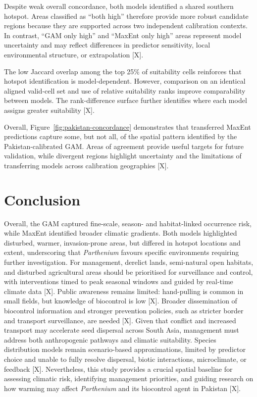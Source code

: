 Despite weak overall concordance, both models identified a shared southern hotspot. Areas classified as ``both high'' therefore provide more robust candidate regions because they are supported across two independent calibration contexts. In contrast, ``GAM only high'' and ``MaxEnt only high'' areas represent model uncertainty and may reflect differences in predictor sensitivity, local environmental structure, or extrapolation [X].

The low Jaccard overlap among the top 25\% of suitability cells reinforces that hotspot identification is model-dependent. However, comparison on an identical aligned valid-cell set and use of relative suitability ranks improve comparability between models. The rank-difference surface further identifies where each model assigns greater suitability [X].

Overall, Figure~\ref{fig:pakistan-concordance} demonstrates that transferred MaxEnt predictions capture some, but not all, of the spatial pattern identified by the Pakistan-calibrated GAM. Areas of agreement provide useful targets for future validation, while divergent regions highlight uncertainty and the limitations of transferring models across calibration geographies [X].

\section{Conclusion}

Overall, the GAM captured fine-scale, season- and habitat-linked occurrence risk, while MaxEnt identified broader climatic gradients. Both models highlighted disturbed, warmer, invasion-prone areas, but differed in hotspot locations and extent, underscoring that \textit{Parthenium} favours specific environments requiring further investigation. For management, derelict lands, semi-natural open habitats, and disturbed agricultural areas should be prioritised for surveillance and control, with interventions timed to peak seasonal windows and guided by real-time climate data [X]. Public awareness remains limited: hand-pulling is common in small fields, but knowledge of biocontrol is low [X]. Broader dissemination of biocontrol information and stronger prevention policies, such as stricter border and transport surveillance, are needed [X]. Given that conflict and increased transport may accelerate seed dispersal across South Asia, management must address both anthropogenic pathways and climatic suitability. Species distribution models remain scenario-based approximations, limited by predictor choice and unable to fully resolve dispersal, biotic interactions, microclimate, or feedback [X]. Nevertheless, this study provides a crucial spatial baseline for assessing climatic risk, identifying management priorities, and guiding research on how warming may affect \textit{Parthenium} and its biocontrol agent in Pakistan [X].